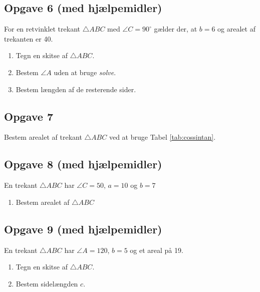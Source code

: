 \subsection*{Opgave 6 (med hjælpemidler)}

For en retvinklet trekant $\triangle ABC$ med $\angle C = 90^\circ$ gælder der, at $b = 6$ og arealet af trekanten er 40.
\begin{enumerate}[label=\roman*)	]
	\item Tegn en skitse af $\triangle ABC$. 
	\item Bestem $\angle A$ uden at bruge \textit{solve}.
	\item Bestem længden af de resterende sider. 
\end{enumerate}

\subsection*{Opgave 7}

Bestem arealet af trekant $\triangle ABC$ ved at bruge Tabel \ref{tab:cossintan}.

\begin{center}
\end{center}

\subsection*{Opgave 8 (med hjælpemidler)}

En trekant $\triangle ABC$ har $\angle C = 50$, $a = 10$ og $b = 7$
\begin{enumerate}[label=\roman*)]
	\item Bestem arealet af $\triangle ABC$
\end{enumerate}

\subsection*{Opgave 9 (med hjælpemidler)}
En trekant $\triangle ABC$ har $\angle A = 120$, $b = 5$ og et areal på 19.
\begin{enumerate}[label=\roman*)]
	\item Tegn en skitse af $\triangle ABC$.
	\item Bestem sidelængden $c$. 
\end{enumerate}

